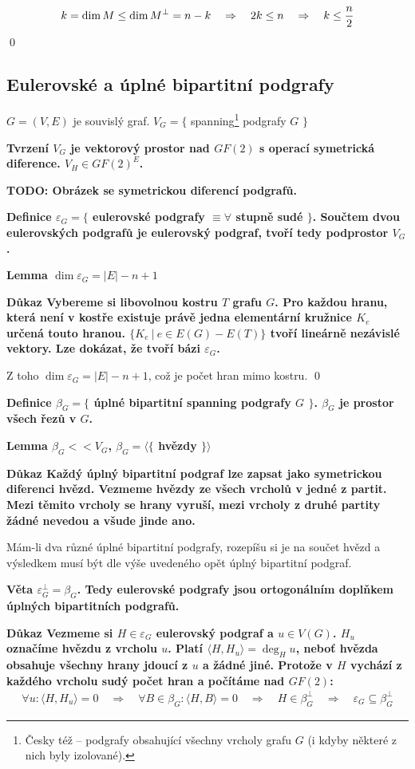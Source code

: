 \documentclass[a4paper,12pt,titlepage]{article}
\newcommand{\lm}{\smallskip\noindent\bf Lemma\rm{} }
\newcommand{\dk}{\smallskip\noindent\bf Důkaz\rm{} }
\newcommand{\df}{\smallskip\noindent\bf Definice\rm{} }
\newcommand{\vt}{\smallskip\noindent\bf Věta\rm{} }
\newcommand{\tv}{\smallskip\noindent\bf Tvrzení\rm{} }
\newcommand{\todo}[1]{\bf TODO: \rm#1}
\newcommand{\sk}[1]{\langle #1\rangle}
\begin{document}
$$k = \dim M \le \dim M^\bot = n-k \quad\Rightarrow\quad 2k \le n \quad\Rightarrow\quad k \le {n\over 2}$$
\qed

\subsection{Eulerovské a úplné bipartitní podgrafy}

$G = (V,E)$ je souvislý graf. $V_G = \{$ spanning\footnote{Česky též  -- podgrafy obsahující všechny vrcholy grafu $G$ (i kdyby některé z nich byly izolované).} podgrafy $G$ $\}$

\tv $V_G$ je vektorový prostor nad $GF(2)$ s operací symetrická diference. $V_H \in GF(2)^E$.

\bigskip
\todo Obrázek se symetrickou diferencí podgrafů.
\bigskip

\df $\varepsilon_G = \{ $ eulerovské podgrafy $\equiv
\forall $ stupně sudé $ \}$. Součtem dvou eulerovských podgrafů je eulerovský
podgraf, tvoří tedy podprostor $V_G$.

\lm $\dim \varepsilon_G = |E| - n + 1$

\dk Vybereme si libovolnou kostru $T$ grafu $G$. Pro každou hranu, která není v
kostře existuje právě jedna elementární kružnice $K_e$ určená touto hranou. $\{
K_e\ |\ e \in E(G) - E(T) \}$ tvoří lineárně nezávislé vektory. Lze dokázat,
že tvoří bázi $\varepsilon_G$.

Z toho $\dim \varepsilon_G = |E| - n + 1$, což je počet hran mimo kostru. \qed

\df $\beta_G = \{$ úplné bipartitní spanning podgrafy $G$ $\}$. $\beta_G$ je
prostor všech řezů v $G$.

\lm $\beta_G << V_G$, $\beta_G = \langle\{$ hvězdy $\}\rangle$

\dk Každý úplný bipartitní podgraf lze zapsat jako symetrickou diferenci hvězd.
Vezmeme hvězdy ze všech vrcholů v jedné z partit. Mezi těmito vrcholy se hrany
vyruší, mezi vrcholy z druhé partity žádné nevedou a všude jinde ano. 

Mám-li dva různé úplné bipartitní podgrafy, rozepíšu si je na součet hvězd a
výsledkem musí být dle výše uvedeného opět úplný bipartitní podgraf.

\vt $\varepsilon_G^\bot = \beta_G$. Tedy eulerovské podgrafy jsou ortogonálním
doplňkem úplných bipartitních podgrafů.

\dk Vezmeme si $H \in \varepsilon_G$ eulerovský podgraf a $u \in V(G)$. $H_u$
označíme hvězdu z vrcholu $u$. Platí $\sk{H,H_u} = \deg_H u$, neboť hvězda
obsahuje všechny hrany jdoucí z $u$ a žádné jiné. Protože v $H$ vychází z
každého vrcholu sudý počet hran a počítáme nad $GF(2)$:
\begin{align*}
\forall u: \sk{H,H_u} = 0 \quad\Rightarrow\quad \forall B\in \beta_G: \sk{H,B} = 0 \quad\Rightarrow\quad H \in \beta_G^\bot \quad\Rightarrow\quad \varepsilon_G \subseteq \beta_G^\bot
\end{align*}
\end{document}
